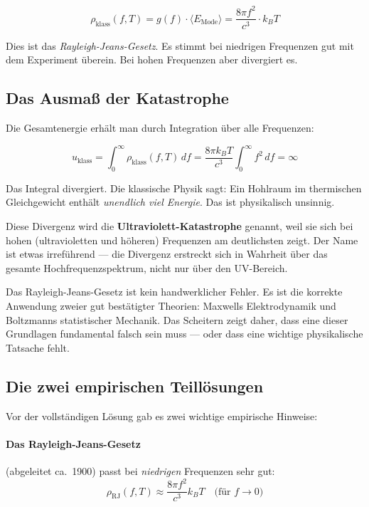 \begin{equation}
    \rho_{\text{klass}}(f, T) = g(f) \cdot \langle E_{\text{Mode}} \rangle 
    = \frac{8\pi f^2}{c^3} \cdot k_B T
    \label{eq:rayleigh_jeans}
\end{equation}

Dies ist das \emph{Rayleigh-Jeans-Gesetz}. Es stimmt bei niedrigen Frequenzen gut 
mit dem Experiment überein. Bei hohen Frequenzen aber divergiert es.

\subsection{Das Ausmaß der Katastrophe}

Die Gesamtenergie erhält man durch Integration über alle Frequenzen:

\begin{equation}
    u_{\text{klass}} = \int_0^\infty \rho_{\text{klass}}(f, T) \, df 
    = \frac{8\pi k_B T}{c^3} \int_0^\infty f^2 \, df = \infty
    \label{eq:uv_divergence}
\end{equation}

Das Integral divergiert. Die klassische Physik sagt: Ein Hohlraum im thermischen 
Gleichgewicht enthält \emph{unendlich viel Energie}. Das ist physikalisch unsinnig.

Diese Divergenz wird die \textbf{Ultraviolett-Katastrophe} genannt, weil sie sich 
bei hohen (ultravioletten und höheren) Frequenzen am deutlichsten zeigt. Der Name 
ist etwas irreführend — die Divergenz erstreckt sich in Wahrheit über das gesamte 
Hochfrequenzspektrum, nicht nur über den UV-Bereich.

\begin{important}
    Das Rayleigh-Jeans-Gesetz ist kein handwerklicher Fehler. Es ist die korrekte 
    Anwendung zweier gut bestätigter Theorien: Maxwells Elektrodynamik und Boltzmanns 
    statistischer Mechanik. Das Scheitern zeigt daher, dass eine dieser Grundlagen 
    fundamental falsch sein muss — oder dass eine wichtige physikalische Tatsache 
    fehlt.
\end{important}

\subsection{Die zwei empirischen Teillösungen}

Vor der vollständigen Lösung gab es zwei wichtige empirische Hinweise:

\paragraph{Das Rayleigh-Jeans-Gesetz} (abgeleitet ca.~1900) passt bei \emph{niedrigen} 
Frequenzen sehr gut:
\begin{equation}
    \rho_{\text{RJ}}(f, T) \approx \frac{8\pi f^2}{c^3} k_B T \quad \text{(für } f \to 0\text{)}
\end{equation}

